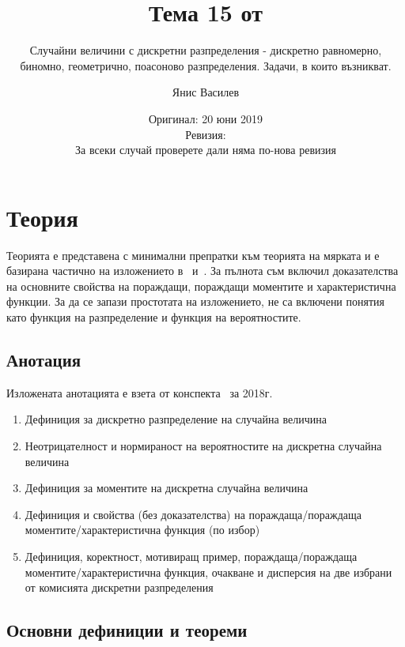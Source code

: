 \documentclass[numbers=endperiod, bibliography=totocnumbered]{scrartcl}
\title{Тема 15 от \URL{https://github.com/v--/se2018}}
\subtitle{Случайни величини с дискретни разпределения - дискретно равномерно, биномно, геометрично, поасоново разпределения. Задачи, в които възникват.}
\author{Янис Василев}
\date{Оригинал: 20 юни 2019 \\ Ревизия:  \\ За всеки случай проверете дали няма по-нова ревизия}
\begin{document}
\maketitle

\section{Теория}

Теорията е представена с минимални препратки към теорията на мярката и е базирана частично на изложението в~\cite{Borovkov} и~\cite{DimitrovYanev}. За пълнота съм включил доказателства на основните свойства на пораждащи, пораждащи моментите и характеристична функции. За да се запази простотата на изложението, не са включени понятия като функция на разпределение и функция на вероятностите.

\subsection{Анотация}

Изложената анотацията е взета от конспекта~\cite{Syllabus} за 2018г.

\begin{enumerate}
  \item Дефиниция за дискретно разпределение на случайна величина
  \item Неотрицателност и нормираност на вероятностите на дискретна случайна величина
  \item Дефиниция за моментите на дискретна случайна величина
  \item Дефиниция и свойства (без доказателства) на пораждаща/пораждаща моментите/характеристична функция (по избор)
  \item Дефиниция, коректност, мотивиращ пример, пораждаща/пораждаща моментите/характеристична функция, очакване и дисперсия на две избрани от комисията дискретни разпределения
\end{enumerate}

\subsection{Основни дефиниции и теореми}
\end{document}
